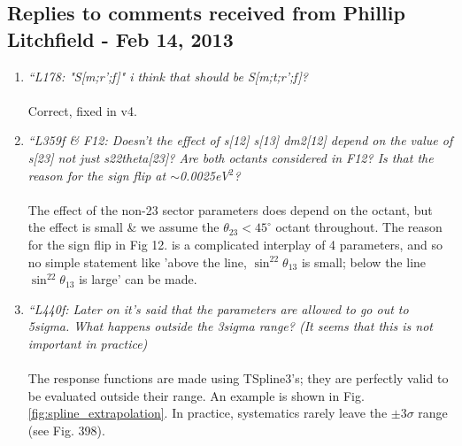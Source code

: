\subsection{
  Replies to comments received from Phillip Litchfield - Feb 14, 2013 }

\begin{enumerate}

\vspace{5 mm}
\item
{\em
  ``L178:
"S[m;r';f]"  i think that should be S[m;t;r';f]?
}\\
\\
Correct, fixed in v4.

\vspace{5 mm}
\item
{\em
	``L359f \& F12:
Doesn't the effect of s[12] s[13] dm2[12] depend on the value of s[23] not just s22theta[23]?  Are both octants considered in F12?  Is that the reason for the sign flip at $\sim$0.0025eV$^2$?
}\\
\\
The effect of the non-23 sector parameters does depend on the octant,
but the effect is small \& we assume the  $\theta_{23} < 45^\circ$
octant throughout.
The reason for the sign flip in Fig 12. is a complicated interplay of
4 parameters, and so no simple statement like 'above the line,
$\sin^22\theta_{13}$ is small; below the line $\sin^22\theta_{13}$ is
large' can be made.

\vspace{5 mm}
\item
{\em
	``L440f:
Later on it's said that the parameters are allowed to go out to 5sigma. What happens outside the 3sigma range? (It seems that this is not important in practice)
}\\
\\
The response functions are made using TSpline3's; they are perfectly
valid to be evaluated outside their range. An example is shown in
Fig. \ref{fig:spline_extrapolation}.
In practice, systematics rarely leave the $\pm 3 \sigma$ range (see
Fig. 398).


\end{enumerate}
